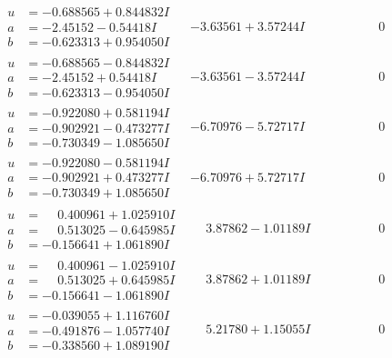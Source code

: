 \documentclass[1p]{elsarticle_modified}
\theoremstyle{definition}
\begin{document}
$$\begin{array}{c|c|c}
\begin{aligned}
u &= -0.688565 + 0.844832 I \\
a &= -2.45152 - 0.54418 I \\
b &= -0.623313 + 0.954050 I\end{aligned}
 & -3.63561 + 3.57244 I & \phantom{-0.000000 } 0 \\ \hline\begin{aligned}
u &= -0.688565 - 0.844832 I \\
a &= -2.45152 + 0.54418 I \\
b &= -0.623313 - 0.954050 I\end{aligned}
 & -3.63561 - 3.57244 I & \phantom{-0.000000 } 0 \\ \hline\begin{aligned}
u &= -0.922080 + 0.581194 I \\
a &= -0.902921 - 0.473277 I \\
b &= -0.730349 - 1.085650 I\end{aligned}
 & -6.70976 - 5.72717 I & \phantom{-0.000000 } 0 \\ \hline\begin{aligned}
u &= -0.922080 - 0.581194 I \\
a &= -0.902921 + 0.473277 I \\
b &= -0.730349 + 1.085650 I\end{aligned}
 & -6.70976 + 5.72717 I & \phantom{-0.000000 } 0 \\ \hline\begin{aligned}
u &= \phantom{-}0.400961 + 1.025910 I \\
a &= \phantom{-}0.513025 - 0.645985 I \\
b &= -0.156641 + 1.061890 I\end{aligned}
 & \phantom{-}3.87862 - 1.01189 I & \phantom{-0.000000 } 0 \\ \hline\begin{aligned}
u &= \phantom{-}0.400961 - 1.025910 I \\
a &= \phantom{-}0.513025 + 0.645985 I \\
b &= -0.156641 - 1.061890 I\end{aligned}
 & \phantom{-}3.87862 + 1.01189 I & \phantom{-0.000000 } 0 \\ \hline\begin{aligned}
u &= -0.039055 + 1.116760 I \\
a &= -0.491876 - 1.057740 I \\
b &= -0.338560 + 1.089190 I\end{aligned}
 & \phantom{-}5.21780 + 1.15055 I & \phantom{-0.000000 } 0 \\ \hline\begin{aligned}

\end{aligned}
\end{array}$$
\end{document}
